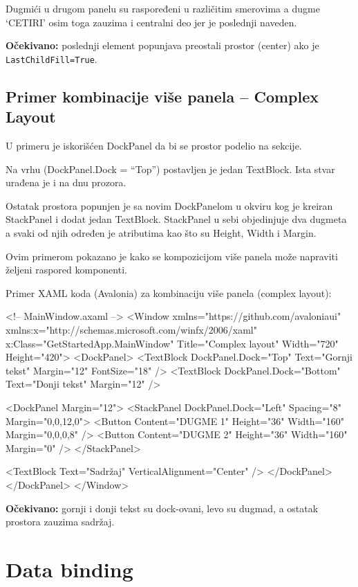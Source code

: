 \documentclass[11pt,a4paper]{article}
\begin{document}
Dugmići u drugom panelu su raspoređeni u različitim smerovima a dugme ‘CETIRI’ osim toga zauzima i centralni deo jer je poslednji naveden.

\textbf{Očekivano:} poslednji element popunjava preostali prostor (center) ako je \texttt{LastChildFill=True}.

\subsection{Primer kombinacije više panela – Complex Layout}
U primeru je iskorišćen DockPanel da bi se prostor podelio na sekcije.

Na vrhu (DockPanel.Dock = “Top”) postavljen je jedan TextBlock. Ista stvar urađena je i na dnu prozora.

Ostatak prostora popunjen je sa novim DockPanelom u okviru kog je kreiran StackPanel i dodat jedan TextBlock. StackPanel u sebi objedinjuje dva dugmeta a svaki od njih određen je atributima kao što su Height, Width i Margin.

Ovim primerom pokazano je kako se kompozicijom više panela može napraviti željeni raspored komponenti.

Primer XAML koda (Avalonia) za kombinaciju više panela (complex layout):

\begin{CodeBlock}
<!-- MainWindow.axaml -->
<Window xmlns="https://github.com/avaloniaui"
        xmlns:x="http://schemas.microsoft.com/winfx/2006/xaml"
        x:Class="GetStartedApp.MainWindow"
        Title="Complex layout" Width="720" Height="420">
  <DockPanel>
    <TextBlock DockPanel.Dock="Top" Text="Gornji tekst" Margin="12" FontSize="18" />
    <TextBlock DockPanel.Dock="Bottom" Text="Donji tekst" Margin="12" />

    <DockPanel Margin="12">
      <StackPanel DockPanel.Dock="Left" Spacing="8" Margin="0,0,12,0">
        <Button Content="DUGME 1" Height="36" Width="160" Margin="0,0,0,8" />
        <Button Content="DUGME 2" Height="36" Width="160" Margin="0" />
      </StackPanel>

      <TextBlock Text="Sadržaj" VerticalAlignment="Center" />
    </DockPanel>
  </DockPanel>
</Window>
\end{CodeBlock}

\textbf{Očekivano:} gornji i donji tekst su dock-ovani, levo su dugmad, a ostatak prostora zauzima sadržaj.

\section{Data binding}
\end{document}
